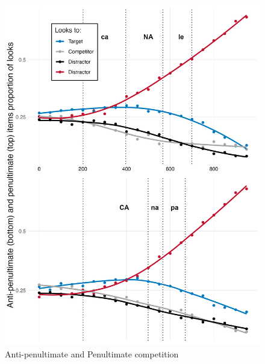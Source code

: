 \begin{figure}[t]
  \centering
  \includegraphics[width=0.6\linewidth]{visuals/pen_vs_anti_pen.jpeg} %
  \caption{Anti-penultimate and Penultimate competition}
  \label{fig:model}
\end{figure}
